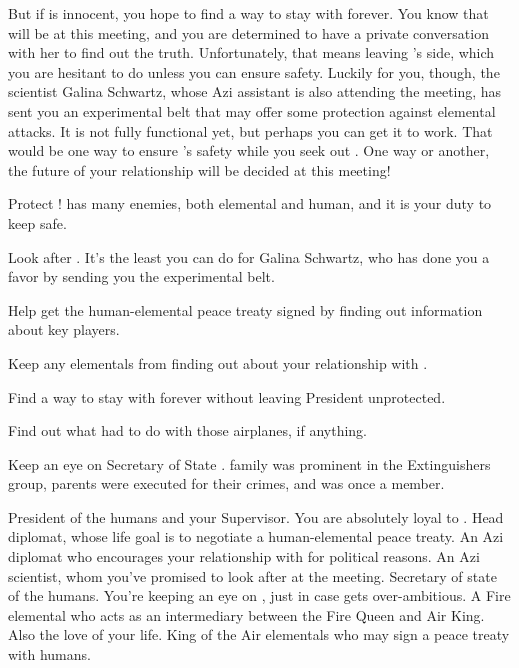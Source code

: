 \documentclass[char]{elementals}
\begin{document}
But if \cJuliet{} is innocent, you hope to find a way to stay with \cJuliet{\them} forever.  You know that \cJuliet{\they} will be at this meeting, and you are determined to have a private conversation with her to find out the truth.  Unfortunately, that means leaving \cLeader{}'s side, which you are hesitant to do unless you can ensure \cLeader{\their} safety.  Luckily for you, though, the scientist Galina Schwartz, whose Azi assistant \cScientist{\intro} is also attending the meeting, has sent you an experimental belt that may offer some protection against elemental attacks.  It is not fully functional yet, but perhaps you can get it to work.  That would be one way to ensure \cLeader{}'s safety while you seek out \cJuliet{}.  One way or another, the future of your relationship will be decided at this meeting!




\begin{itemz}[Goals]
  \item Protect \cLeader{\full}!  \cLeader{\They} has many enemies, both elemental and human, and it is your duty to keep \cLeader{\them} safe.
  \item Look after \cScientist{\full}.  It's the least you can do for Galina Schwartz, who has done you a favor by sending you the experimental belt.
  \item Help \cLeader{} get the human-elemental peace treaty signed by finding out information about key players.
  \item Keep any elementals from finding out about your relationship with \cJuliet{}.
  \item Find a way to stay with \cJuliet{} forever without leaving President \cLeader{} unprotected.
  \item Find out what \cJuliet{} had to do with those airplanes, if anything.
  \item Keep an eye on Secretary of State \cDema{\full}.  \cDema{\Their} family was prominent in the Extinguishers group, \cDema{\their} parents were executed for their crimes, and 
  \cDema{\they} \cDema{\themself} was once a member.
\end{itemz}

\begin{contacts}
  \contact{\cLeader{}} President of the humans and your Supervisor.  You are absolutely loyal to \cLeader{\them}.
  \contact{\cAvatar{}} Head diplomat, whose life goal is to negotiate a human-elemental peace treaty.
  \contact{\cDiplomat{}} An Azi diplomat who encourages your relationship with \cJuliet{} for political reasons.
  \contact{\cScientist{}} An Azi scientist, whom you've promised to look after at the meeting.
  \contact{\cDema{}} Secretary of state of the humans.  You're keeping an eye on \cDema{\them}, just in case \cDema{\they} gets over-ambitious.
  \contact{\cJuliet{}} A Fire elemental who acts as an intermediary between the Fire Queen and Air King.  Also the love of your life.
  \contact{\cKing{}} King of the Air elementals who may sign a peace treaty with humans.
\end{contacts}
\end{document}
